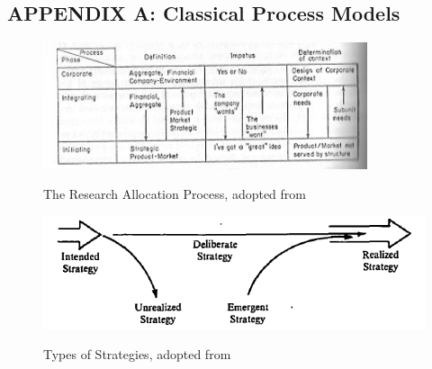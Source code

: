 \documentclass[12pt,letterpaper]{article}
\begin{document}
\newpage
\appendix
\begin{singlespace}
\section{APPENDIX A: Classical Process Models}
\begin{figure}[h]
\begin{centering}
  \caption{The Research Allocation Process, adopted from \cite{Bower1970}}
  \includegraphics[width=0.85\textwidth]{Bower1970}
  \label{fig:Bower1970}
\end{centering}
\end{figure}

\begin{figure}[h]
\begin{centering}
  \caption{Types of Strategies, adopted from \cite{Mintzberg1978}}
  \includegraphics[width=\textwidth]{Mintzberg1978}
  \label{fig:Mintzberg1978}
\end{centering}
\end{figure}


\end{singlespace}
\end{document}
